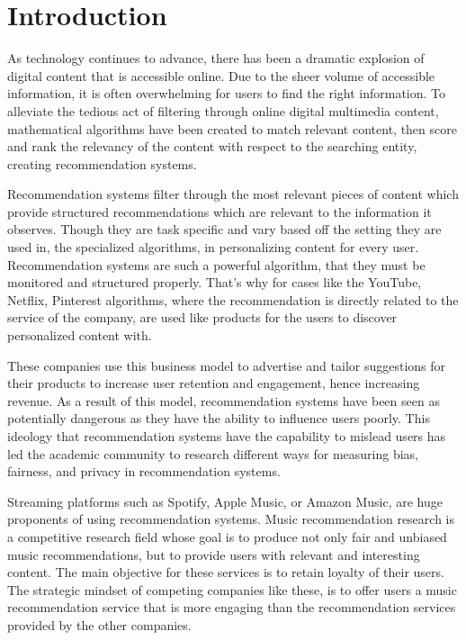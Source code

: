 \normallinespacing
\chapter{Introduction}

As technology continues to advance, there has been a dramatic explosion of digital content that is accessible online. Due to the sheer volume of accessible information, it is often overwhelming for users to find the right information. To alleviate the tedious act of filtering through online digital multimedia content, mathematical algorithms have been created to match relevant content, then score and rank the relevancy of the content with respect to the searching entity, creating recommendation systems. 

Recommendation systems filter through the most relevant pieces of content which provide structured recommendations which are relevant to the information it observes. \cite{Jannach2022} Though they are task specific and vary based off the setting they are used in, the specialized algorithms, in personalizing content for every user. Recommendation systems are such a powerful algorithm, that they must be monitored and structured properly. That's why for cases like the YouTube\cite{Davidson2010TheYV}, Netflix\cite{gomez2015netflix}, Pinterest \cite{ying2018graph} algorithms, where the recommendation is directly related to the service of the company, are used like products for the users to discover personalized content with.

These companies use this business model to advertise and tailor suggestions for their products to increase user retention and engagement, hence increasing revenue. \cite{lu2012recommender} As a result of this model, recommendation systems have been seen as potentially dangerous as they have the ability to influence users poorly. This ideology that recommendation systems have the capability to mislead users has led the academic community to research different ways for measuring bias, fairness, and privacy in recommendation systems. \cite{milano2020recommender}

Streaming platforms such as Spotify, Apple Music, or Amazon Music, are huge proponents of using recommendation systems. Music recommendation research is a competitive research field whose goal is to produce not only fair and unbiased music recommendations, but to provide users with relevant and interesting content. The main objective for these services is to retain loyalty of their users. \cite{jacobson2016music} The strategic mindset of competing companies like these, is to offer users a music recommendation service that is more engaging than the recommendation services provided by the other companies. 

